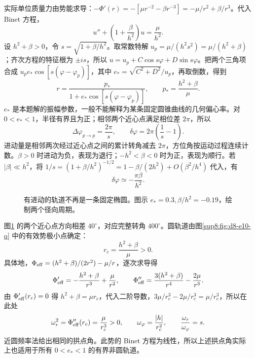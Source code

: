 \begin{solution}
实际单位质量力由势能求导：$-\Phi'(r)=-[\mu r^{-2}-\beta r^{-3}]=-\mu/r^2+\beta/r^3$。代入 Binet 方程，
\[
 u''+\left(1+\frac\beta{h^2}\right)u=\frac\mu{h^2}.
\]
设 $h^2+\beta>0$，令 $s=\sqrt{1+\beta/h^2}$。取常数特解 $u_p=\mu/(h^2s^2)=\mu/(h^2+\beta)$；齐次方程的特征根为 $\pm is$，所以 $u=u_p+C\cos s\varphi+D\sin s\varphi$。把两个三角项合成 $u_pe_*\cos[s(\varphi-\varphi_p)]$，其中 $e_*=\sqrt{C^2+D^2}/u_p$，再取倒数，得到
\begin{equation}
 r=\frac{p_*}{1+e_*\cos[s(\varphi-\varphi_p)]},\qquad
 p_*=\frac{h^2+\beta}{\mu}.
\end{equation}
$e_*$ 是本题解的振幅参数，一般不能解释为某条固定圆锥曲线的几何偏心率。对 $0<e_*<1$，半径有界且为正；相邻两个近心点满足相位差 $2\pi$，所以
\[
 \Delta\varphi_{p\to p}=\frac{2\pi}s,\qquad
 \boxed{\delta\varphi=2\pi\left(\frac1s-1\right)}.
\]
进动量是相邻两次经过近心点之间的累计转角减去 $2\pi$，方位角按运动过程连续计数。$\beta>0$ 时进动为负，表现为退行；$-h^2<\beta<0$ 时为正，表现为顺行。若 $|\beta|\ll h^2$，将 $1/s=(1+\beta/h^2)^{-1/2}=1-\beta/(2h^2)+O(\beta^2/h^4)$ 代入，有
\[
 \delta\varphi\simeq-\frac{\pi\beta}{h^2}.
\]
\begin{figure}[H]\centering
{}
\caption{有进动的轨道不再是一条固定椭圆。图示 $e_*=0.3,\beta/h^2=-0.19$，绘制两个径向周期。}\label{sup8:fig:d8-e10-s}
\end{figure}
图\ref{sup8:fig:d8-e10-s} 的两个近心点方向相差 $40^\circ$，对应完整转角 $400^\circ$。圆轨道由图\ref{sup8:fig:d8-e10-q} 中的有效势极小点确定：
\[
 r_c=\frac{h^2+\beta}{\mu}>0.
\]
具体地，$\Phi_{\rm eff}=(h^2+\beta)/(2r^2)-\mu/r$，逐次求导得
\[
\Phi_{\rm eff}'=-\frac{h^2+\beta}{r^3}+\frac\mu{r^2},\qquad
\Phi_{\rm eff}''=\frac{3(h^2+\beta)}{r^4}-\frac{2\mu}{r^3}.
\]
由 $\Phi_{\rm eff}'(r_c)=0$ 得 $h^2+\beta=\mu r_c$，代入二阶导数，$3\mu/r_c^3-2\mu/r_c^3=\mu/r_c^3$，所以在此处
\[
 \omega_r^2=\Phi_{\rm eff}''(r_c)=\frac\mu{r_c^3}>0,
 \qquad \omega_\varphi=\frac{|h|}{r_c^2},\qquad
 \frac{\omega_r}{\omega_\varphi}=s.
\]
近圆频率法给出相同的拱点角。此势的 Binet 方程为线性，所以上述拱点角实际上也适用于所有 $0<e_*<1$ 的有界非圆轨道。


\end{solution}
